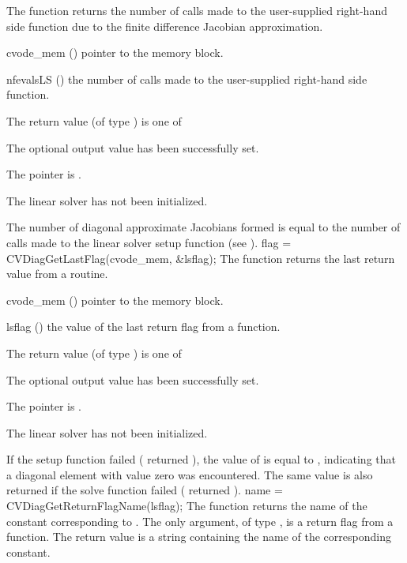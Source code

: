 {
  The function  returns the
  number of calls made to the user-supplied right-hand side function due to the
  finite difference Jacobian approximation.
}
{
  \begin{args}
  \item[cvode\_mem] ()
    pointer to the {\cvodes} memory block.
  \item[nfevalsLS] ()
    the number of calls made to the user-supplied right-hand side function.
  \end{args}
}
{
  The return value  (of type ) is one of
  \begin{args}
  \item[\Id{CVDIAG\_SUCCESS}]
    The optional output value has been successfully set.
  \item[\Id{CVDIAG\_MEM\_NULL}]
    The  pointer is .
  \item[\Id{CVDIAG\_LMEM\_NULL}]
    The {\cvdiag} linear solver has not been initialized.
  \end{args}
}
{
  The number of diagonal approximate Jacobians formed is
  equal to the number of calls made to the linear solver setup function
  (see ).
}
{
  flag = CVDiagGetLastFlag(cvode\_mem, \&lsflag);
}
{
  The function  returns the
  last return value from a {\cvdiag} routine.
}
{
  \begin{args}
  \item[cvode\_mem] ()
    pointer to the {\cvodes} memory block.
  \item[lsflag] ()
    the value of the last return flag from a {\cvdiag} function.
  \end{args}
}
{
  The return value  (of type ) is one of
  \begin{args}
  \item[\Id{CVDIAG\_SUCCESS}]
    The optional output value has been successfully set.
  \item[\Id{CVDIAG\_MEM\_NULL}]
    The  pointer is .
  \item[\Id{CVDIAG\_LMEM\_NULL}]
    The {\cvdiag} linear solver has not been initialized.
  \end{args}
}
{
  If the {\cvdiag} setup function failed ( returned ),
  the value of  is equal to , indicating that a
  diagonal element with value zero was encountered.
  The same value is also returned if the {\cvdiag} solve function failed
  ( returned ).
}
{
  name = CVDiagGetReturnFlagName(lsflag);
}
{
  The function  returns the
  name of the {\cvdiag} constant corresponding to .
}
{
  The only argument, of type , is a return flag from a {\cvdiag} function.
}
{
  The return value is a string containing the name of the corresponding constant.
}
{}


